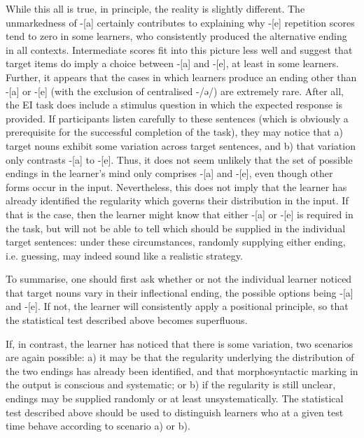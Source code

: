 While this all is true, in principle, the reality is slightly different. The unmarkedness of -[a] certainly contributes to explaining why -[e] repetition scores tend to zero in some learners, who consistently produced the alternative ending in all contexts. Intermediate scores fit into this picture less well and suggest that target items do imply a choice between -[a] and -[e], at least in some learners. Further, it appears that the cases in which learners produce an ending other than -[a] or -[e] (with the exclusion of centralised -/ə/) are extremely rare. After all, the EI task does include a stimulus question in which the expected response is provided. If participants listen carefully to these sentences (which is obviously a prerequisite for the successful completion of the task), they may notice that a) target nouns exhibit some variation across target sentences, and b) that variation only contrasts -[a] to -[e]. Thus, it does not seem unlikely that the set of possible endings in the learner’s mind only comprises -[a] and -[e], even though other forms occur in the input. Nevertheless, this does not imply that the learner has already identified the regularity which governs their distribution in the input. If that is the case, then the learner might know that either -[a] or -[e] is required in the task, but will not be able to tell which should be supplied in the individual target sentences: under these circumstances, randomly supplying either ending, i.e. guessing, may indeed sound like a realistic strategy.

To summarise, one should first ask whether or not the individual learner noticed that target nouns vary in their inflectional ending, the possible options being -[a] and -[e]. If not, the learner will consistently apply a positional principle, so that the statistical test described above becomes superfluous.

If, in contrast, the learner has noticed that there is some variation, two scenarios are again possible:  a) it may be that the regularity underlying the distribution of the two endings has already been identified, and that morphosyntactic marking in the output is conscious and systematic; or b) if the regularity is still unclear, endings may be supplied randomly or at least unsystematically. The statistical test described above should be used to distinguish learners who at a given test time behave according to scenario a) or b). 

